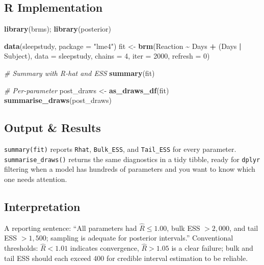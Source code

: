 \documentclass[
]{article}
\newenvironment{Shaded}{\begin{snugshade}}{\end{snugshade}}
\newcommand{\AttributeTok}[1]{\textcolor[rgb]{0.13,0.29,0.53}{#1}}
\newcommand{\CommentTok}[1]{\textcolor[rgb]{0.56,0.35,0.01}{\textit{#1}}}
\newcommand{\DecValTok}[1]{\textcolor[rgb]{0.00,0.00,0.81}{#1}}
\newcommand{\FunctionTok}[1]{\textcolor[rgb]{0.13,0.29,0.53}{\textbf{#1}}}
\newcommand{\NormalTok}[1]{#1}
\newcommand{\OtherTok}[1]{\textcolor[rgb]{0.56,0.35,0.01}{#1}}
\newcommand{\SpecialCharTok}[1]{\textcolor[rgb]{0.81,0.36,0.00}{\textbf{#1}}}
\newcommand{\StringTok}[1]{\textcolor[rgb]{0.31,0.60,0.02}{#1}}
\begin{document}
\subsection{R Implementation}\label{r-implementation}

\begin{Shaded}
\begin{Highlighting}[]
\FunctionTok{library}\NormalTok{(brms); }\FunctionTok{library}\NormalTok{(posterior)}

\FunctionTok{data}\NormalTok{(sleepstudy, }\AttributeTok{package =} \StringTok{"lme4"}\NormalTok{)}
\NormalTok{fit }\OtherTok{\textless{}{-}} \FunctionTok{brm}\NormalTok{(Reaction }\SpecialCharTok{\textasciitilde{}}\NormalTok{ Days }\SpecialCharTok{+}\NormalTok{ (Days }\SpecialCharTok{|}\NormalTok{ Subject), }\AttributeTok{data =}\NormalTok{ sleepstudy,}
           \AttributeTok{chains =} \DecValTok{4}\NormalTok{, }\AttributeTok{iter =} \DecValTok{2000}\NormalTok{, }\AttributeTok{refresh =} \DecValTok{0}\NormalTok{)}

\CommentTok{\# Summary with R{-}hat and ESS}
\FunctionTok{summary}\NormalTok{(fit)}

\CommentTok{\# Per{-}parameter}
\NormalTok{post\_draws }\OtherTok{\textless{}{-}} \FunctionTok{as\_draws\_df}\NormalTok{(fit)}
\FunctionTok{summarise\_draws}\NormalTok{(post\_draws)}
\end{Highlighting}
\end{Shaded}

\subsection{Output \& Results}\label{output-results}

\texttt{summary(fit)} reports \texttt{Rhat}, \texttt{Bulk\_ESS}, and
\texttt{Tail\_ESS} for every parameter. \texttt{summarise\_draws()}
returns the same diagnostics in a tidy tibble, ready for \texttt{dplyr}
filtering when a model has hundreds of parameters and you want to know
which one needs attention.

\subsection{Interpretation}\label{interpretation}

A reporting sentence: ``All parameters had \(\hat R \le 1.00\), bulk ESS
\(> 2{,}000\), and tail ESS \(> 1{,}500\); sampling is adequate for
posterior intervals.'' Conventional thresholds: \(\hat R < 1.01\)
indicates convergence, \(\hat R > 1.05\) is a clear failure; bulk and
tail ESS should each exceed 400 for credible interval estimation to be
reliable.
\end{document}
